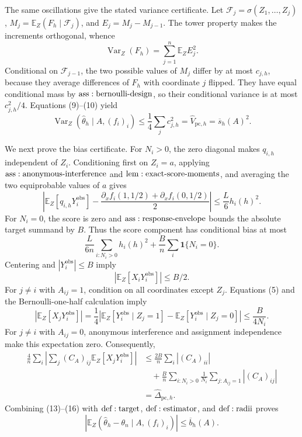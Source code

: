 The same oscillations give the stated variance certificate.  Let \(\mathcal F_j=\sigma(Z_1,\ldots,Z_j)\), \(M_j=\mathbb E_Z(F_h\mid\mathcal F_j)\), and \(E_j=M_j-M_{j-1}\).  The tower property makes the increments orthogonal, whence
\[
 \operatorname{Var}_Z(F_h)=\sum_{j=1}^n\mathbb E_ZE_j^2.
\tag{10}
\]
Conditional on \(\mathcal F_{j-1}\), the two possible values of \(M_j\) differ by at most \(c_{j,h}\), because they average differences of \(F_h\) with coordinate \(j\) flipped.  They have equal conditional mass by \({\rm ass:bernoulli\text{-}design}\), so their conditional variance is at most \(c_{j,h}^2/4\).  Equations (9)--(10) yield
\[
 \operatorname{Var}_Z(\widehat\theta_h\mid A,(f_i)_i)
 \leq\frac14\sum_jc_{j,h}^2
 =\widehat V_{\mathrm{pc},h}=\overline s_h(A)^2.
\tag{11}
\]

We next prove the bias certificate.  For \(N_i>0\), the zero diagonal makes \(q_{i,h}\) independent of \(Z_i\).  Conditioning first on \(Z_i=a\), applying \({\rm ass:anonymous\text{-}interference}\) and \({\rm lem:exact\text{-}score\text{-}moments}\), and averaging the two equiprobable values of \(a\) gives
\[
 \left|\mathbb E_Z[q_{i,h}Y_i^{\mathrm{obs}}]
 -\frac{\partial_xf_i(1,1/2)+\partial_xf_i(0,1/2)}2\right|
 \leq\frac L6h_i(h)^2.
\tag{12}
\]
For \(N_i=0\), the score is zero and \({\rm ass:response\text{-}envelope}\) bounds the absolute target summand by \(B\).  Thus the score component has conditional bias at most
\[
 \frac{L}{6n}\sum_{i:N_i>0}h_i(h)^2
 +\frac Bn\sum_i\mathbf1\{N_i=0\}.
\tag{13}
\]
Centering and \(|Y_i^{\mathrm{obs}}|\leq B\) imply
\[
 |\mathbb E_Z[X_iY_i^{\mathrm{obs}}]|\leq B/2.
\tag{14}
\]
For \(j\ne i\) with \(A_{ij}=1\), condition on all coordinates except \(Z_j\).  Equations (5) and the Bernoulli-one-half calculation imply
\[
 |\mathbb E_Z[X_jY_i^{\mathrm{obs}}]|
 =\frac14\left|\mathbb E_Z[Y_i^{\mathrm{obs}}\mid Z_j=1]
 -\mathbb E_Z[Y_i^{\mathrm{obs}}\mid Z_j=0]\right|
 \leq\frac B{4N_i}.
\tag{15}
\]
For \(j\ne i\) with \(A_{ij}=0\), anonymous interference and assignment independence make this expectation zero.  Consequently,
\[
\begin{aligned}
 \frac4n\sum_i\left|\sum_j(C_A)_{ij}\mathbb E_Z[X_jY_i^{\mathrm{obs}}]\right|
 &\leq\frac{2B}{n}\sum_i|(C_A)_{ii}|\\
 &\quad+\frac Bn\sum_{i:N_i>0}\frac1{N_i}
       \sum_{j:A_{ij}=1}|(C_A)_{ij}|\\
 &=\widehat\Delta_{\mathrm{pc},h}.
\end{aligned}
\tag{16}
\]
Combining (13)--(16) with \({\rm def:target}\), \({\rm def:estimator}\), and \({\rm def:radii}\) proves
\[
 \left|\mathbb E_Z(\widehat\theta_h-\theta_n\mid A,(f_i)_i)\right|
 \leq\overline b_h(A).
\tag{17}
\]

